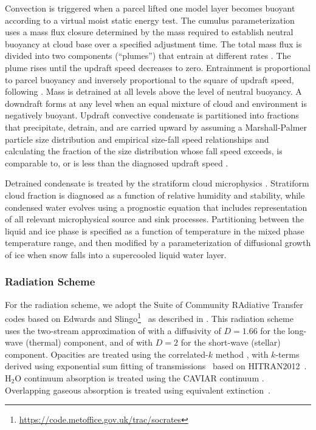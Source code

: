 \documentclass[11pt,numberedappendix,twocolappendix,]{emulateapj}
\begin{document}
%
Convection is triggered when a parcel lifted one model layer becomes buoyant according to a virtual moist static energy test. 
The cumulus parameterization uses a mass flux closure determined by the mass required to establish neutral buoyancy at cloud base over a specified adjustment time. 
The total mass flux is divided into two components (``plumes'') that entrain at different rates \citep{DelGenio2007}. 
The plume rises until the updraft speed decreases to zero. 
Entrainment is proportional to parcel buoyancy and inversely proportional to the square of updraft speed, following \citet{Gregory2001}. 
Mass is detrained at all levels above the level of neutral buoyancy. 
A downdraft forms at any level when an equal mixture of cloud and environment is negatively buoyant. 
Updraft convective condensate is partitioned into fractions that precipitate, detrain, and are carried upward by assuming a Marshall-Palmer particle size distribution and empirical size-fall speed relationships and calculating the fraction of the size distribution whose fall speed exceeds, is comparable to, or is less than the diagnosed updraft speed \citep{DelGenio2005}. 

Detrained condensate is treated by the stratiform cloud microphysics \citep[an updated version of][]{DelGenio1996}. 
Stratiform cloud fraction is diagnosed as a function of relative humidity and stability, while condensed water evolves using a prognostic equation that includes representation of all relevant microphysical source and sink processes.  
Partitioning between the liquid and ice phase is specified as a function of temperature in the mixed phase temperature range, and then modified by a parameterization of diffusional growth of ice when snow falls into a supercooled liquid water layer. 


\subsubsection{Radiation Scheme}
\label{sss:radiation}

For the radiation scheme, we adopt the Suite of Community RAdiative Transfer codes based on Edwards and Slingo\footnote{\url{https://code.metoffice.gov.uk/trac/socrates}}~\citep[SOCRATES,][]{EdwardsSlingo1996,Edwards1996} as described in \citet{Way2017}.
This radiation scheme uses the two-stream approximation of \citet{Zdunkowski1985} with a diffusivity of $D=1.66$ for the long-wave (thermal) component, and of \citet{Zdunkowski1980} with $D=2$ for the short-wave (stellar) component. 
Opacities are treated using the correlated-$k$ method \citep{Lacis1991,Goody1989}, with $k$-terms derived using exponential sum fitting of transmissions~\citep{Wiscombe1977} based on HITRAN2012~\citep{Rothman2013}. 
H$_2$O continuum absorption is treated using the CAVIAR continuum \citep{Ptashnik2011}.
Overlapping gaseous absorption is treated using equivalent extinction~\citep{Edwards1996,Amundsen2016}. 
\end{document}

